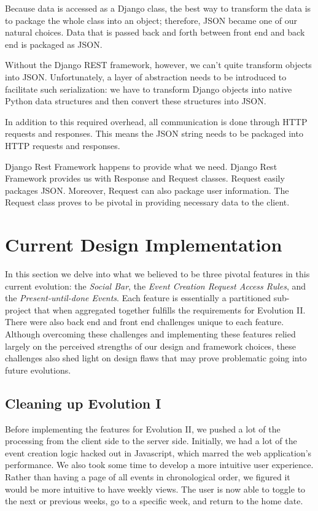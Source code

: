 \documentclass[a4paper]{article}
\begin{document}
Because data is accessed as a Django class, the best way to transform the data is to package the whole class into an object; therefore, JSON became one of our natural choices. Data that is passed back and forth between front end and back end is packaged as JSON. 

Without the Django REST framework, however, we can't quite transform objects into JSON. Unfortunately, a layer of abstraction needs to be introduced to facilitate such serialization: we have to transform Django objects into native Python data structures  and then convert these structures into JSON. 

In addition to this required overhead, all communication is done through HTTP requests and responses. This means the JSON string needs to be packaged into HTTP requests and responses. 

Django Rest Framework happens to provide what we need. Django Rest Framework provides us with Response and Request classes. Request easily packages JSON. Moreover, Request can also package user information. The Request class proves to be pivotal in providing necessary data to the client.


\section{Current Design Implementation}

In this section we delve into what we believed to be three pivotal features in this current evolution: the \textit{Social Bar}, the \textit{Event Creation Request Access Rules}, and the \textit{Present-until-done Events}. Each feature is essentially a partitioned sub-project that when aggregated together fulfills the requirements for Evolution II. There were also back end and front end challenges unique to each feature. Although overcoming these challenges and implementing these features relied largely on the perceived strengths of our design and framework choices, these challenges also shed light on design flaws that may prove problematic going into future evolutions.

\subsection{Cleaning up Evolution I}

Before implementing the features for Evolution II, we pushed a lot of the processing from the client side to the server side. Initially, we had a lot of the event creation logic hacked out in Javascript, which marred the web application's performance. We also took some time to develop a more intuitive user experience. Rather than having a page of all events in chronological order, we figured it would be more intuitive to have weekly views. The user is now able to toggle to the next or previous weeks, go to a specific week, and return to the home date.
\end{document}

